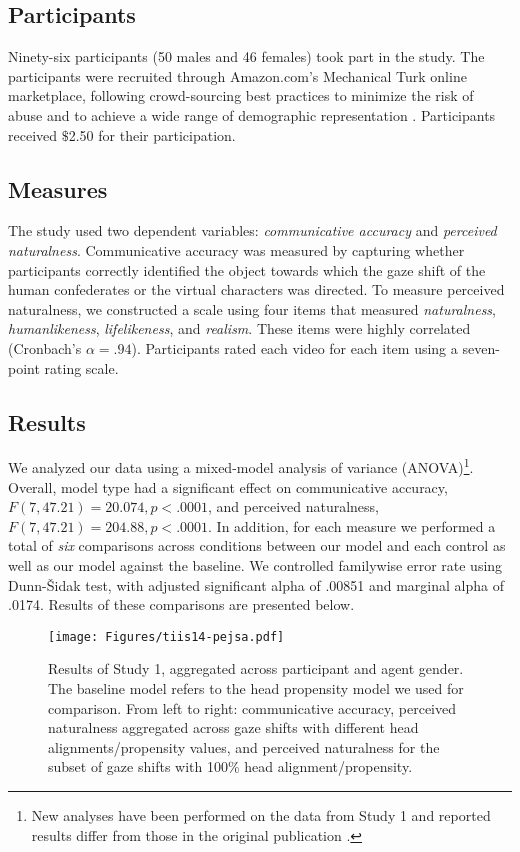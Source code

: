 \subsection{Participants}

Ninety-six participants (50 males and 46 females) took part in the study. The participants were recruited through Amazon.com's Mechanical Turk online marketplace, following crowd-sourcing best practices to minimize the risk of abuse and to achieve a wide range of demographic representation \cite{kittur2008crowdsourcing}. Participants received $\$$2.50 for their participation.

\subsection{Measures}

The study used two dependent variables: \emph{communicative accuracy} and \emph{perceived naturalness}. Communicative accuracy was measured by capturing whether participants correctly identified the object towards which the gaze shift of the human confederates or the virtual characters was directed. To measure perceived naturalness, we constructed a scale using four items that measured \emph{naturalness}, \emph{humanlikeness}, \emph{lifelikeness}, and \emph{realism}. These items were highly correlated (Cronbach's $\alpha = .94$). Participants rated each video for each item using a seven-point rating scale.

\subsection{Results}

We analyzed our data using a mixed-model analysis of variance (ANOVA)\footnote{New analyses have been performed on the data from Study 1 and reported results differ from those in the original publication \cite{andrist2012headeye}.}. Overall, model type had a significant effect on communicative accuracy, $F(7, 47.21) = 20.074, p < .0001$, and perceived naturalness, $F(7, 47.21) = 204.88, p < .0001$. In addition, for each measure we performed a total of \emph{six} comparisons across conditions between our model and each control as well as our model against the baseline. We controlled familywise error rate using Dunn-\v{S}idak test, with adjusted significant alpha of .00851 and marginal alpha of .0174. Results of these comparisons are presented below.

\begin{figure}[t]
  \centering
  \texttt{[image: Figures/tiis14-pejsa.pdf]}
  \caption{Results of Study 1, aggregated across participant and agent gender. The baseline model refers to the head propensity model we used for comparison. From left to right: communicative accuracy, perceived naturalness aggregated across gaze shifts with different head alignments/propensity values, and perceived naturalness for the subset of gaze shifts with 100\% head alignment/propensity.}
  \label{fig:ModelEvalResults}
\end{figure}

